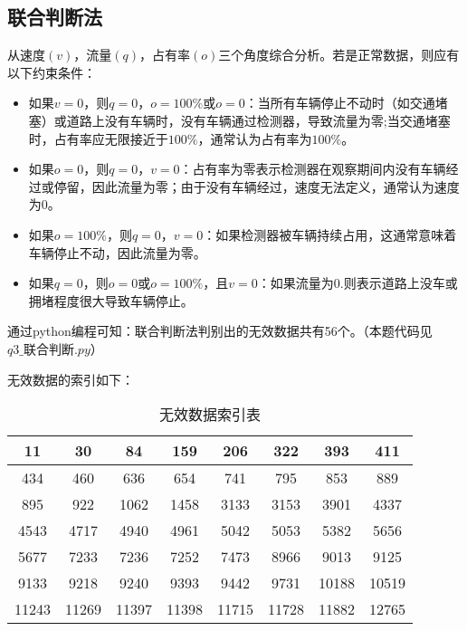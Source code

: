 \documentclass[withoutpreface,bwprint]{cumcmthesis} %
\begin{document}
    \subsection{联合判断法}
    从速度$(v)$，流量$(q)$，占有率$(o)$三个角度综合分析。若是正常数据，则应有以下约束条件：
    \begin{itemize}
        \item  如果$v=0$，则$q=0$，$o=100\%$或$o=0$：当所有车辆停止不动时（如交通堵塞）或道路上没有车辆时，没有车辆通过检测器，导致流量为零;当交通堵塞时，占有率应无限接近于$100\%$，通常认为占有率为$100\%$。
        \item 如果$o=0$，则$q=0$，$v=0$：占有率为零表示检测器在观察期间内没有车辆经过或停留，因此流量为零；由于没有车辆经过，速度无法定义，通常认为速度为0。
        \item 如果$o=100\%$，则$q=0$，$v=0$：如果检测器被车辆持续占用，这通常意味着车辆停止不动，因此流量为零。
        \item 如果$q=0$，则$o=0$或$o=100\%$，且$v=0$：如果流量为0.则表示道路上没车或拥堵程度很大导致车辆停止。
    \end{itemize}
    通过python编程可知：联合判断法判别出的无效数据共有56个。（本题代码见$q3\_\text{联合判断}.py$）\par
    无效数据的索引如下：\par
        \begin{table}[!htbp]
            \centering
            \caption{无效数据索引表}
            \begin{tabular}{|c|c|c|c|c|c|c|c|}
                \hline
                11 & 30 & 84 & 159 & 206 & 322 & 393 & 411 \\ \hline
                434 & 460 & 636 & 654 & 741 & 795 & 853 & 889 \\ \hline
                895 & 922 & 1062 & 1458 & 3133 & 3153 & 3901 & 4337 \\ \hline
                4543 & 4717 & 4940 & 4961 & 5042 & 5053 & 5382 & 5656 \\ \hline
                5677 & 7233 & 7236 & 7252 & 7473 & 8966 & 9013 & 9125 \\ \hline
                9133 & 9218 & 9240 & 9393 & 9442 & 9731 & 10188 & 10519 \\ \hline
                11243 & 11269  & 11397 & 11398 & 11715  & 11728 & 11882  & 12765  \\ \hline
                \end{tabular}
        \end{table}\par
\end{document}
